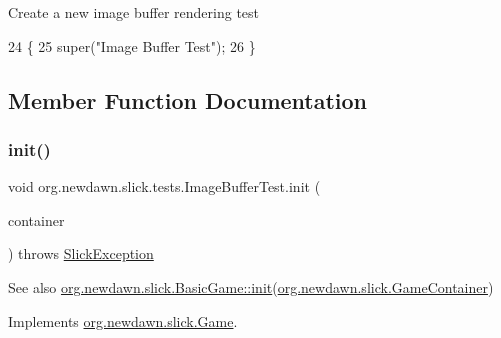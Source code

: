 Create a new image buffer rendering test 
\begin{DoxyCode}
24                              \{
25         super(\textcolor{stringliteral}{"Image Buffer Test"});
26     \}
\end{DoxyCode}


\subsection{Member Function Documentation}
\mbox{\label{classorg_1_1newdawn_1_1slick_1_1tests_1_1_image_buffer_test_a3fef5aad2f8b60fd274af7d974f9583a}} 
\subsubsection{\texorpdfstring{init()}{init()}}
{\footnotesize\ttfamily void org.\+newdawn.\+slick.\+tests.\+Image\+Buffer\+Test.\+init (\begin{DoxyParamCaption}\item[{\mbox{\hyperlink{classorg_1_1newdawn_1_1slick_1_1_game_container}{Game\+Container}}}]{container }\end{DoxyParamCaption}) throws \mbox{\hyperlink{classorg_1_1newdawn_1_1slick_1_1_slick_exception}{Slick\+Exception}}\hspace{0.3cm}{\ttfamily [inline]}}

\begin{DoxySeeAlso}{See also}
\mbox{\hyperlink{classorg_1_1newdawn_1_1slick_1_1_basic_game_a8af0900217e4d389249f71367b22d114}{org.\+newdawn.\+slick.\+Basic\+Game\+::init}}(\mbox{\hyperlink{classorg_1_1newdawn_1_1slick_1_1_game_container}{org.\+newdawn.\+slick.\+Game\+Container}}) 
\end{DoxySeeAlso}


Implements \mbox{\hyperlink{interfaceorg_1_1newdawn_1_1slick_1_1_game_ad2dd6affab08bb8fdb5fab0815957b7a}{org.\+newdawn.\+slick.\+Game}}.


